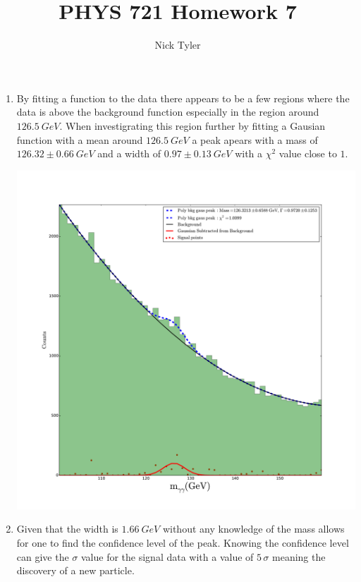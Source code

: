 \documentclass[pdftex]{article}
\title{PHYS 721 Homework 7}
\author{Nick Tyler}
\date{}
\begin{document}
\captionsetup[figure]{aboveskip=-15pt}
\captionsetup[figure]{belowskip=15pt}
\maketitle
\begin{enumerate}
	\item  By fitting a function to the data there appears to be a few regions where the data
			is above the background function especially in the region around $126.5 \: GeV.$
			When investigrating this region further by fitting a Gausian function with a mean
			around $126.5 \: GeV$ a peak apears with a mass of $126.32 \pm 0.66 \: GeV$ and a
			width of $0.97 \pm 0.13 \: GeV$ with a $\chi^{2}$ value close to $1.$\

		\includegraphics[scale=0.35]{Problem_1.pdf}\\

	\item Given that the width is $1.66 \: GeV$ without any knowledge of the mass allows for one to find
			the confidence level of the peak.  Knowing the confidence level can give the $\sigma$ value
			for the signal data with a value of $5\,\sigma$ meaning the discovery of a new particle. 


\end{enumerate}
\end{document}
